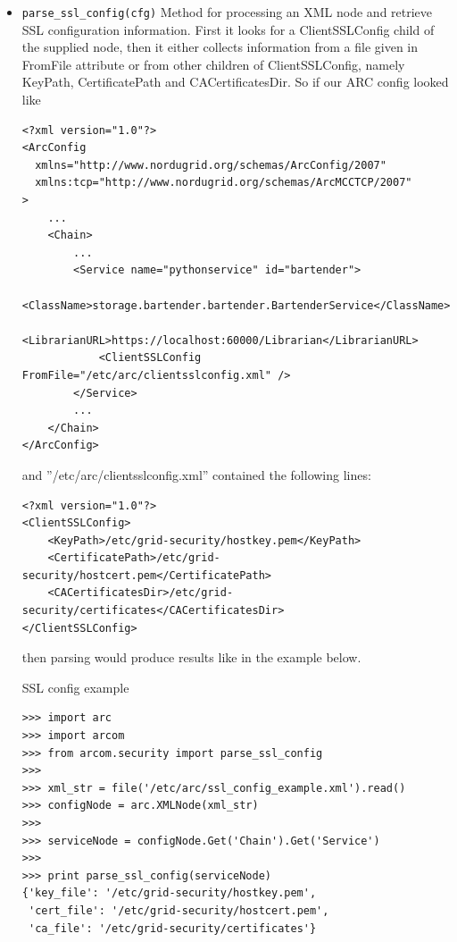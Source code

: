 \documentclass{article}
\begin{document}
\begin{flushleft}
\begin{itemize}
  \item{ \verb$parse_ssl_config(cfg)$\newline
  Method for processing an XML node and retrieve SSL configuration information.
  First it looks for a ClientSSLConfig child of the supplied node, 
  then it either collects information from a file given in FromFile attribute
  or from other children of ClientSSLConfig, namely KeyPath, CertificatePath 
  and CACertificatesDir.\newline
  So if our ARC config looked like
\begin{verbatim}
<?xml version="1.0"?>
<ArcConfig 
  xmlns="http://www.nordugrid.org/schemas/ArcConfig/2007"
  xmlns:tcp="http://www.nordugrid.org/schemas/ArcMCCTCP/2007"
>
    ...
    <Chain>
        ...
        <Service name="pythonservice" id="bartender">
            <ClassName>storage.bartender.bartender.BartenderService</ClassName>
            <LibrarianURL>https://localhost:60000/Librarian</LibrarianURL>
            <ClientSSLConfig FromFile="/etc/arc/clientsslconfig.xml" />
        </Service>
        ...
    </Chain>
</ArcConfig>
\end{verbatim}
  and ''/etc/arc/clientsslconfig.xml'' contained the following lines:
\begin{verbatim}
<?xml version="1.0"?>
<ClientSSLConfig>
    <KeyPath>/etc/grid-security/hostkey.pem</KeyPath>
    <CertificatePath>/etc/grid-security/hostcert.pem</CertificatePath>
    <CACertificatesDir>/etc/grid-security/certificates</CACertificatesDir>
</ClientSSLConfig>
\end{verbatim}
  then parsing would produce results like in the example below.
    \begin{example}
      \caption{SSL config example}\label{sslconfex}
\begin{verbatim}
>>> import arc
>>> import arcom
>>> from arcom.security import parse_ssl_config
>>> 
>>> xml_str = file('/etc/arc/ssl_config_example.xml').read()
>>> configNode = arc.XMLNode(xml_str)
>>> 
>>> serviceNode = configNode.Get('Chain').Get('Service')
>>> 
>>> print parse_ssl_config(serviceNode)
{'key_file': '/etc/grid-security/hostkey.pem', 
 'cert_file': '/etc/grid-security/hostcert.pem', 
 'ca_file': '/etc/grid-security/certificates'}
\end{verbatim}
    \end{example}
  }
\end{itemize}

\end{flushleft}
\end{document}

